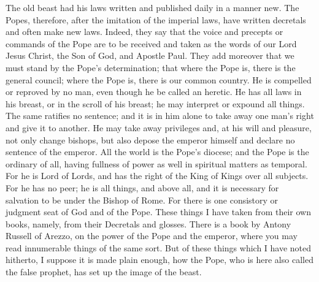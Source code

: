 The old beast had his laws written and published daily in a manner new. The Popes, therefore, after the imitation of the imperial laws, have written decretals and often make new laws. Indeed, they say that the voice and precepts or commands of the Pope are to be received and taken as the words of our Lord Jesus Christ, the Son of God, and Apostle Paul. They add moreover that we must stand by the Pope’s determination; that where the Pope is, there is the general council; where the Pope is, there is our common country. He is compelled or reproved by no man, even though he be called an heretic. He has all laws in his breast, or in the scroll of his breast; he may interpret or expound all things. The same ratifies no sentence; and it is in him alone to take away one man’s right and give it to another. He may take away privileges and, at his will and pleasure, not only change bishops, but also depose the emperor himself and declare no sentence of the emperor. All the world is the Pope’s diocese; and the Pope is the ordinary of all, having fullness of power as well in spiritual matters as temporal. For he is Lord of Lords, and has the right of the King of Kings over all subjects. For he has no peer; he is all things, and above all, and it is necessary for salvation to be under the Bishop of Rome. For there is one consistory or judgment seat of God and of the Pope. These things I have taken from their own books, namely, from their Decretals and glosses. There is a book by Antony Russell of Arezzo, on the power of the Pope and the emperor, where you may read innumerable things of the same sort. But of these things which I have noted hitherto, I suppose it is made plain enough, how the Pope, who is here also called the false prophet, has set up the image of the beast.

